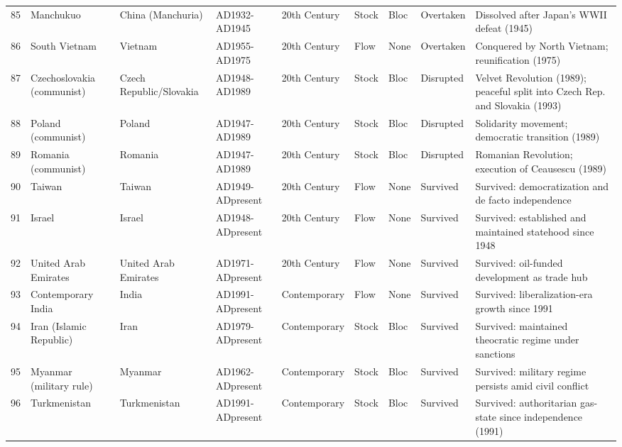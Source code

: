 \documentclass[11pt]{article}
\begin{document}
\begin{longtable}{@{}r l l l l l l l p{5.5cm}@{}}
85 & Manchukuo & China (Manchuria) & AD1932-AD1945 & 20th Century & Stock & Bloc & Overtaken & Dissolved after Japan's WWII defeat (1945) \\
86 & South Vietnam & Vietnam & AD1955-AD1975 & 20th Century & Flow & None & Overtaken & Conquered by North Vietnam; reunification (1975) \\
87 & Czechoslovakia (communist) & Czech Republic/Slovakia & AD1948-AD1989 & 20th Century & Stock & Bloc & Disrupted & Velvet Revolution (1989); peaceful split into Czech Rep. and Slovakia (1993) \\
88 & Poland (communist) & Poland & AD1947-AD1989 & 20th Century & Stock & Bloc & Disrupted & Solidarity movement; democratic transition (1989) \\
89 & Romania (communist) & Romania & AD1947-AD1989 & 20th Century & Stock & Bloc & Disrupted & Romanian Revolution; execution of Ceausescu (1989) \\
90 & Taiwan & Taiwan & AD1949-ADpresent & 20th Century & Flow & None & Survived & Survived: democratization and de facto independence \\
91 & Israel & Israel & AD1948-ADpresent & 20th Century & Flow & None & Survived & Survived: established and maintained statehood since 1948 \\
92 & United Arab Emirates & United Arab Emirates & AD1971-ADpresent & 20th Century & Flow & None & Survived & Survived: oil-funded development as trade hub \\
93 & Contemporary India & India & AD1991-ADpresent & Contemporary & Flow & None & Survived & Survived: liberalization-era growth since 1991 \\
94 & Iran (Islamic Republic) & Iran & AD1979-ADpresent & Contemporary & Stock & Bloc & Survived & Survived: maintained theocratic regime under sanctions \\
95 & Myanmar (military rule) & Myanmar & AD1962-ADpresent & Contemporary & Stock & Bloc & Survived & Survived: military regime persists amid civil conflict \\
96 & Turkmenistan & Turkmenistan & AD1991-ADpresent & Contemporary & Stock & Bloc & Survived & Survived: authoritarian gas-state since independence (1991) \\
\end{longtable}
\end{document}
